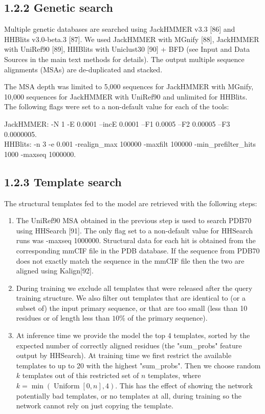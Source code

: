 \documentclass[10pt]{article}
\begin{document}
\subsection*{1.2.2 Genetic search}
Multiple genetic databases are searched using JackHMMER v3.3 [86] and HHBlits v3.0-beta.3 [87]. We used JackHMMER with MGnify [88], JackHMMER with UniRef90 [89], HHBlits with Uniclust30 [90] + BFD (see Input and Data Sources in the main text methods for details). The output multiple sequence alignments (MSAs) are de-duplicated and stacked.

The MSA depth was limited to 5,000 sequences for JackHMMER with MGnify, 10,000 sequences for JackHMMER with UniRef90 and unlimited for HHBlits. The following flags were set to a non-default value for each of the tools:

JackHMMER: -N 1 -E 0.0001 --incE 0.0001 --F1 0.0005 --F2 0.00005 --F3 0.0000005.\\
HHBlits: -n 3 -e 0.001 -realign\_max 100000 -maxfilt 100000 -min\_prefilter\_hits 1000 -maxseq 1000000.

\subsection*{1.2.3 Template search}
The structural templates fed to the model are retrieved with the following steps:

\begin{enumerate}
  \item The UniRef90 MSA obtained in the previous step is used to search PDB70 using HHSearch [91]. The only flag set to a non-default value for HHSearch runs was -maxseq 1000000. Structural data for each hit is obtained from the corresponding mmCIF file in the PDB database. If the sequence from PDB70 does not exactly match the sequence in the mmCIF file then the two are aligned using Kalign[92].
  \item During training we exclude all templates that were released after the query training structure. We also filter out templates that are identical to (or a subset of) the input primary sequence, or that are too small (less than 10 residues or of length less than $10 \%$ of the primary sequence).
  \item At inference time we provide the model the top 4 templates, sorted by the expected number of correctly aligned residues (the "sum\_probs" feature output by HHSearch). At training time we first restrict the available templates to up to 20 with the highest "sum\_probs". Then we choose random $k$ templates out of this restricted set of $n$ templates, where $k=\min (\operatorname{Uniform}[0, n], 4)$. This has the effect of showing the network potentially bad templates, or no templates at all, during training so the network cannot rely on just copying the template.
\end{enumerate}
\end{document}
